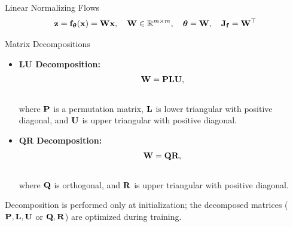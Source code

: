 \documentclass{beamer}
\renewcommand{\eqpause}{}
\begin{document}
\begin{frame}{Linear Normalizing Flows}
	\vspace{-0.3cm}
	\[
		\mathbf{z} = \mathbf{f}_{\boldsymbol{\theta}}(\mathbf{x}) = \mathbf{W} \mathbf{x}, \quad \mathbf{W} \in \mathbb{R}^{m \times m}, \quad \boldsymbol{\theta} = \mathbf{W}, \quad \mathbf{J}_{\mathbf{f}} = \mathbf{W}^\top
	\]
	\vspace{-0.7cm}
	\eqpause
	\begin{block}{Matrix Decompositions}
		\begin{itemize}
			\item \textbf{LU Decomposition:}
			\vspace{-0.3cm}
			\[
				\mathbf{W} = \mathbf{P} \mathbf{L} \mathbf{U},
			\]
			\vspace{-0.7cm} \\
			where $\mathbf{P}$ is a permutation matrix, $\mathbf{L}$ is lower triangular with positive diagonal, and $\mathbf{U}$ is upper triangular with positive diagonal.
			\eqpause
			\item \textbf{QR Decomposition:}
			\vspace{-0.3cm}
			\[
				\mathbf{W} = \mathbf{Q} \mathbf{R},
			\]
			\vspace{-0.7cm} \\
			where $\mathbf{Q}$ is orthogonal, and $\mathbf{R}$ is upper triangular with positive diagonal.
		\end{itemize}
	\end{block}
    \eqpause
	Decomposition is performed only at initialization; the decomposed matrices ($\mathbf{P}, \mathbf{L}, \mathbf{U}$ or $\mathbf{Q}, \mathbf{R}$) are optimized during training.

\end{frame}
\end{document}
